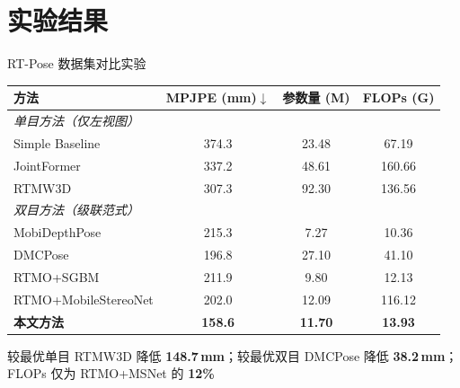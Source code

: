 \documentclass{beamer}
\begin{document}
\section{实验结果}

\begin{frame}{RT-Pose 数据集对比实验}
    \begin{table}
        \centering
        \footnotesize
        \renewcommand{\arraystretch}{1.1}
        \begin{tabular}{lccc}
            \toprule
            方法 & MPJPE (mm)$\downarrow$ & 参数量 (M) & FLOPs (G) \\
            \midrule
            \multicolumn{4}{l}{\textit{单目方法（仅左视图）}} \\
            Simple Baseline & 374.3 & 23.48 & 67.19 \\
            JointFormer & 337.2 & 48.61 & 160.66 \\
            RTMW3D & 307.3 & 92.30 & 136.56 \\
            \midrule
            \multicolumn{4}{l}{\textit{双目方法（级联范式）}} \\
            MobiDepthPose & 215.3 & 7.27 & 10.36 \\
            DMCPose & 196.8 & 27.10 & 41.10 \\
            RTMO+SGBM & 211.9 & 9.80 & 12.13 \\
            RTMO+MobileStereoNet & 202.0 & 12.09 & 116.12 \\
            \midrule
            \textbf{本文方法} & \textbf{158.6} & \textbf{11.70} & \textbf{13.93} \\
            \bottomrule
        \end{tabular}
    \end{table}
    \vspace{2pt}
    \footnotesize\centering
    较最优单目 RTMW3D 降低 \textbf{148.7\,mm}；较最优双目 DMCPose 降低 \textbf{38.2\,mm}；FLOPs 仅为 RTMO+MSNet 的 \textbf{12\%}
\end{frame}
\end{document}
